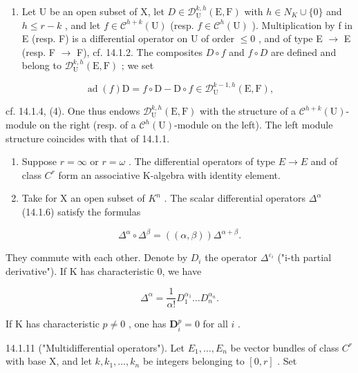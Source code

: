\begin{enumerate}
\def\labelenumi{\alph{enumi})}
\tightlist
\item
  Let U be an open subset of X, let \(D \in \mathcal{D}_{\mathrm{U}}^{k,h}(\mathrm{E}, \mathrm{F})\) with \(h \in N_{K} \cup \{0\}\) and \(h \leqslant r-k\) , and let \(f \in \mathcal{C}^{h+k}(\mathrm{U})\) (resp. \(f \in \mathcal{C}^{h}(\mathrm{U})\) ). Multiplication by f in E (resp. F) is a differential operator on U of order \(\leqslant0\) , and of type E \(\to\) E (resp. F \(\to\) F), cf. 14.1.2. The composites \(D\circ f\) and \(f\circ D\) are defined and belong to \(\mathcal{D}_{\mathrm{U}}^{k,h}(\mathrm{E},\mathrm{F})\) ; we set
\end{enumerate}

\[
\operatorname{ad} (f) \mathrm{D} = f \circ \mathrm{D} - \mathrm{D} \circ f \in \mathcal {D} _ {\mathrm{U}} ^ {k - 1, h} (\mathrm{E}, \mathrm{F}),
\]

cf. 14.1.4, (4). One thus endows \(\mathcal{D}_{\mathrm{U}}^{k,h}(\mathrm{E},\mathrm{F})\) with the structure of a \(\mathcal{C}^{h+k}(\mathrm{U})\)-module on the right (resp. of a \(\mathcal{C}^h (\mathrm{U})\)-module on the left). The left module structure coincides with that of 14.1.1.

\begin{enumerate}
\def\labelenumi{\alph{enumi})}
\setcounter{enumi}{1}
\item
  Suppose \(r = \infty\) or \(r = \omega\) . The differential operators of type \(E \to E\) and of class \(C^r\) form an associative K-algebra with identity element.
\item
  Take for X an open subset of \(K^{n}\) . The scalar differential operators \(\Delta^{\alpha}\) (14.1.6) satisfy the formulas
\end{enumerate}

\[
\Delta^ {\alpha} \circ \Delta^ {\beta} = ((\alpha , \beta)) \Delta^ {\alpha + \beta}.
\]

They commute with each other. Denote by \(D_{i}\) the operator \(\Delta^{\varepsilon_{i}}\) ("i-th partial derivative"). If K has characteristic 0, we have

\[
\Delta^ {\alpha} = \frac {1}{\alpha !} D _ {1} ^ {\alpha_{1}} \dots D _ {n} ^ {\alpha_{n}}.
\]

If K has characteristic \(p \neq 0\) , one has \(\mathbf{D}_{i}^{p} = 0\) for all \(i\) .

14.1.11 ("Multidifferential operators"). Let \(E_{1}, \ldots, E_{n}\) be vector bundles of class \(C^{r}\) with base X, and let \(k, k_{1}, \ldots, k_{n}\) be integers belonging to \([0, r]\) . Set

